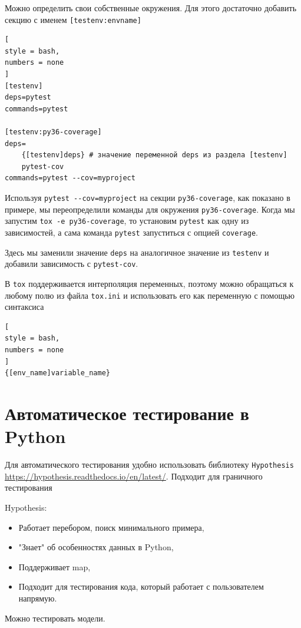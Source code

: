 \documentclass[%
	11pt,
	a4paper,
	utf8,
		]{article}
\begin{document}
Можно определить свои собственные окружения. Для этого достаточно добавить секцию с именем \texttt{[testenv:envname]}
\begin{lstlisting}[
style = bash,
numbers = none	
]
[testenv]
deps=pytest
commands=pytest

[testenv:py36-coverage]
deps=
    {[testenv]deps} # значение переменной deps из раздела [testenv]
    pytest-cov
commands=pytest --cov=myproject
\end{lstlisting}

Используя \verb|pytest --cov=myproject| на секции \texttt{py36-coverage}, как показано в примере, мы переопределили команды для окружения \texttt{py36-coverage}. Когда мы запустим \texttt{tox -e py36-coverage}, то установим \texttt{pytest} как одну из зависимостей, а сама команда \texttt{pytest} запуститься с опцией \texttt{coverage}.

Здесь мы заменили значение \texttt{deps} на аналогичное значение из \texttt{testenv} и добавили зависимость с \texttt{pytest-cov}.

В \texttt{tox} поддерживается интерполяция переменных, поэтому можно обращаться к любому полю из файла \texttt{tox.ini} и использовать его как переменную с помощью синтаксиса
\begin{lstlisting}[
style = bash,
numbers = none	
]
{[env_name]variable_name}
\end{lstlisting}


\section{Автоматическое тестирование в Python}

Для автоматического тестирования удобно использовать библиотеку \texttt{Hypothesis} \url{https://hypothesis.readthedocs.io/en/latest/}. Подходит для граничного тестирования

Hypothesis:
\begin{itemize}
	\item Работает перебором, поиск минимального примера,
	
	\item "Знает" об особенностях данных в Python,
	
	\item Поддерживает map,
	
	\item Подходит для тестирования кода, который работает с пользователем напрямую.
\end{itemize}

Можно тестировать модели.
\end{document}
